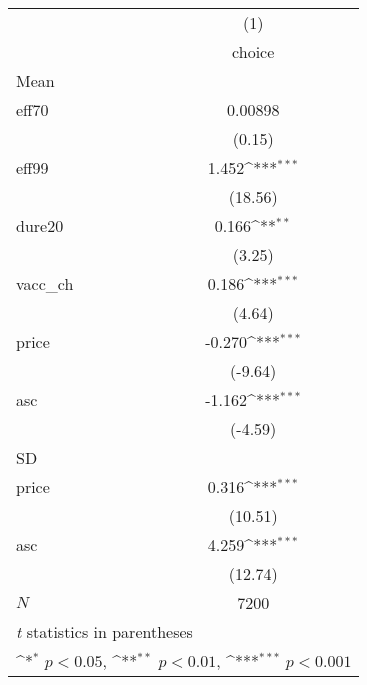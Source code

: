 {
\def\sym#1{\ifmmode^{#1}\else\(^{#1}\)\fi}
\begin{tabular}{l*{1}{c}}
\hline\hline
            &\multicolumn{1}{c}{(1)}\\
            &\multicolumn{1}{c}{choice}\\
\hline
Mean        &                     \\
eff70       &     0.00898         \\
            &      (0.15)         \\
[1em]
eff99       &       1.452\sym{***}\\
            &     (18.56)         \\
[1em]
dure20      &       0.166\sym{**} \\
            &      (3.25)         \\
[1em]
vacc\_ch     &       0.186\sym{***}\\
            &      (4.64)         \\
[1em]
price       &      -0.270\sym{***}\\
            &     (-9.64)         \\
[1em]
asc         &      -1.162\sym{***}\\
            &     (-4.59)         \\
\hline
SD          &                     \\
price       &       0.316\sym{***}\\
            &     (10.51)         \\
[1em]
asc         &       4.259\sym{***}\\
            &     (12.74)         \\
\hline
\(N\)       &        7200         \\
\hline\hline
\multicolumn{2}{l}{\footnotesize \textit{t} statistics in parentheses}\\
\multicolumn{2}{l}{\footnotesize \sym{*} \(p<0.05\), \sym{**} \(p<0.01\), \sym{***} \(p<0.001\)}\\
\end{tabular}
}
